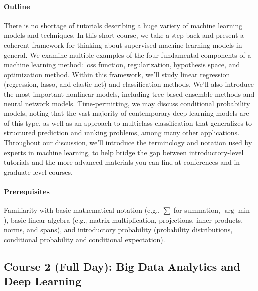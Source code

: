 \documentclass[11pt]{article}
\begin{document}
\paragraph{Outline}
There is no shortage of tutorials describing a huge variety of machine
learning models and techniques. In this short course, we take a step
back and present a coherent framework for thinking about supervised
machine learning models in general. We examine multiple examples of
the four fundamental components of a machine learning method: loss
function, regularization, hypothesis space, and optimization
method. Within this framework, we'll study linear regression
(regression, lasso, and elastic net) and classification methods. We'll
also introduce the most important nonlinear models, including
tree-based ensemble methods and neural network
models. Time-permitting, we may discuss conditional probability
models, noting that the vast majority of contemporary deep learning
models are of this type, as well as an approach to multiclass
classification that generalizes to structured prediction and ranking
problems, among many other applications. Throughout our discussion,
we'll introduce the terminology and notation used by experts in
machine learning, to help bridge the gap between introductory-level
tutorials and the more advanced materials you can find at conferences
and in graduate-level courses.

\paragraph{Prerequisites}
Familiarity with basic mathematical notation (e.g., $\sum$ for summation,
$\arg\min$), basic linear algebra (e.g., matrix multiplication,
projections, inner products, norms, and spans), and introductory
probability (probability distributions, conditional probability and
conditional expectation).

        
\subsection*{Course 2 (Full Day): Big Data Analytics and Deep
  Learning}
\end{document}
